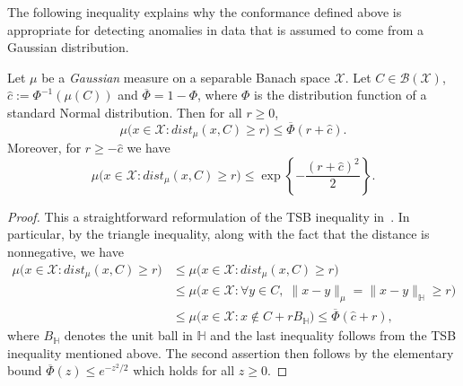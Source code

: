 \documentclass[twoside,11pt]{article}
\numberwithin{equation}{section}
\numberwithin{theorem}{section}
\newcommand{\X}{\mathcal{X}}
\newcommand{\Hh}{\mathbb{H}}
\begin{document}
\noindent The following inequality explains why the conformance defined above is appropriate for detecting anomalies in data that is assumed to come from a Gaussian distribution.

\begin{theorem}\label{thm:TSB} Let $\mu$ be a \textit{Gaussian} measure on a separable Banach space $\X$. Let $C\in\mathscr{B}(\X)$, $\widehat{c}:=\Phi^{-1}(\mu(C))$ and $\overline{\Phi}=1-\Phi$, where $\Phi$ is the distribution function of a standard Normal distribution. Then for all $r\geq 0$,
      $$\mu\bigg( x\in\X: dist_\mu(x, C)\geq r     \bigg)\leq \overline{\Phi}(r+\widehat{c}).$$  
Moreover, for $r\geq -\widehat{c}$
we have 
 $$
 \mu\bigg( x\in\X: dist_\mu(x, C)\geq r     \bigg)
\leq \exp\left\{-\frac{(r+\widehat{c})^2}{2}\right\}.
$$ 

\end{theorem}
\begin{proof}
This a straightforward reformulation of the TSB inequality in~\cite[Theorem 11.6]{friz2020course}.
In particular, by the triangle inequality, along with the fact that the distance is nonnegative, we have 
\begin{equation*}
    \begin{aligned}
        \mu\bigg( x\in\X: dist_\mu(x, C)\geq r     \bigg)&\leq \mu\bigg( x\in\X: dist_\mu(x, C)\geq r   \bigg) 
        \\&\leq  \mu\bigg( x\in\X: \forall y\in C,\; \| x-y\|_{\mu}=\| x-y\|_{\Hh}\geq r  \bigg)\\&\leq  \mu\bigg( x\in\X: x\notin C+rB_\Hh     \bigg)\leq \overline{\Phi}(\widehat{c}+r),
    \end{aligned}
\end{equation*}
where $B_\Hh$ denotes the unit ball in $\Hh$ and the last inequality follows from the TSB inequality mentioned above. 
The second assertion then follows by the elementary bound $\overline{\Phi}(z)\leq e^{-z^2/2}$ which holds for all $z\geq 0$. 
\end{proof}
 
\end{document}
